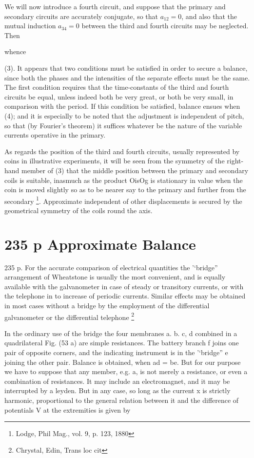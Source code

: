 We will now introduce a fourth circuit, and suppose that the primary and
secondary circuits are accurately conjugate, so that
\(a_{12}=0\), and also that the mutual induction \(a_{34}=0\) between the third
and fourth circuits may be neglected.  Then

whence

(3).  It appears that
two conditions must be satisfied in order to secure a balance, since both the
phases and the intensities of the separate effects must be the same. The first
condition requires that the time-constants of the third and fourth circuits be
equal, unless indeed both be very great, or both be very small, in comparison
with the period. If this condition be satisfied, balance ensues when (4); and
it is especially to be noted that the adjustment is independent of pitch, so
that (by Fourier's theorem) it suffices whatever be the nature of the variable
currents operative in the primary.

As regards the position of the third and fourth circuits, usually represented
by coins in illustrative experiments, it will be seen from the symmetry of the
right-hand member of (3) that the middle position between the primary and
secondary coils is suitable, inasmuch as the product OisOg is stationary in
value when the coin is moved slightly so as to be nearer say to the primary
and further from the secondary
\footnote{Lodge, Phil Mag., vol. 9, p. 123, 1880}.
Approximate independent of other displacements
is secured by the geometrical symmetry of the coils round the axis.

\section{235 p Approximate Balance}
235 p. For the accurate comparison of electrical quantities the '‘bridge''
arrangement of Wheatstone is usually the most convenient, and is equally
available with the galvanometer in case of steady or transitory currents, or
with the telephone in to increase of periodic currents. Similar effects may be
obtained in most cases without a bridge by the employment of the differential
galvanometer or the differential telephone \footnote{Chrystal, Edin, Trans loc cit}

In the ordinary use of the bridge the four membranes a. b. c, d combined in a
quadrilateral Fig. (53 a) are simple resistances. The battery branch f joins
one pair of opposite corners, and the indicating instrument is in the '‘bridge”
e joining the other pair.  Balance is obtained, when ad = be. But for our
purpose we have to suppose that any member, e.g. a, is not merely a resistance,
or even a combination of resistances. It may include an electromagnet, and it
may be interrupted by a leyden. But in any case, so long as the current x is
strictly harmonic, proportional to the general relation between it and the
difference of potentials V at the extremities is given by

